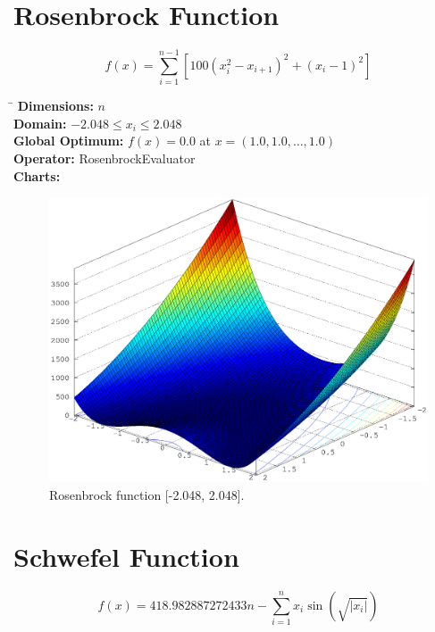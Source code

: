 \documentclass[12pt, a4paper]{article}
\begin{document}
	\section*{Rosenbrock Function}
		\begin{equation*}
			f(x)=\sum\limits_{i=1}^{n-1}[100(x_i^2-x_{i+1})^2+(x_i-1)^2]
		\end{equation*}

		\begin{tabbing}
			\hspace{5cm}\=\kill
			\textbf{Dimensions:}     \> $n$ \\
			\textbf{Domain:}         \> $-2.048 \leq x_i \leq 2.048$ \\
			\textbf{Global Optimum:} \> $f(x) = 0.0$ at $x = (1.0, 1.0, \dots, 1.0)$ \\
			\textbf{Operator:}       \> RosenbrockEvaluator \\
			\textbf{Charts:}         \> \\
		\end{tabbing}

		\begin{figure}[ht]
			\includegraphics[width=\textwidth]{Images/Rosenbrock}
			\caption{Rosenbrock function [-2.048, 2.048].}
		\end{figure}

	\newpage

	\section*{Schwefel Function}
		\begin{equation*}
			f(x)=418.982887272433n - \sum\limits_{i=1}^n x_i\sin(\sqrt{|x_i|})
		\end{equation*}
\end{document}

